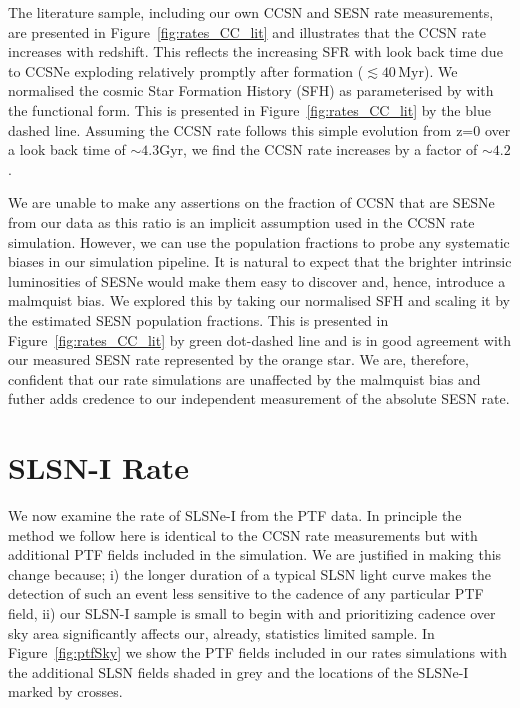 \documentclass[a4paper,fleqn,usenatbib]{mnras}
\begin{document}
The literature sample, including our own CCSN and SESN rate measurements, are presented in Figure~\ref{fig:rates_CC_lit} and illustrates that the CCSN rate increases with redshift. This reflects the increasing SFR with look back time due to CCSNe exploding relatively promptly after formation ($\lesssim40\,\mathrm{Myr}$). We normalised the cosmic Star Formation History (SFH) as parameterised by \citet{2008MNRAS.388.1487L} with the \citet{2001MNRAS.326..255C} functional form. This is presented in Figure~\ref{fig:rates_CC_lit} by the blue dashed line. Assuming the CCSN rate follows this simple evolution from z=0 over a look back time of $\sim4.3$Gyr, we find the CCSN rate increases by a factor of $\sim 4.2$.

We are unable to make any assertions on the fraction of CCSN that are SESNe from our data as this ratio is an implicit assumption used in the CCSN rate simulation. However, we can use the \citet{2017PASP..129e4201S} population fractions to probe any systematic biases in our simulation pipeline. It is natural to expect that the brighter intrinsic luminosities of SESNe would make them easy to discover and, hence, introduce a malmquist bias. We explored this by taking our normalised SFH and scaling it by the estimated SESN population fractions. This is presented in Figure~\ref{fig:rates_CC_lit} by green dot-dashed line and is in good agreement with our measured SESN rate represented by the orange star. We are, therefore, confident that our rate simulations are unaffected by the malmquist bias and futher adds credence to our independent measurement of the absolute SESN rate.


\section{SLSN-I Rate}

We now examine the rate of SLSNe-I from the PTF data. In principle the method we follow here is identical to the CCSN rate measurements but with additional PTF fields included in the simulation. We are justified in making this change because; i) the longer duration of a typical SLSN light curve makes the detection of such an event less sensitive to the cadence of any particular PTF field, ii) our SLSN-I sample is small to begin with and prioritizing cadence over sky area significantly affects our, already, statistics limited sample. In Figure~\ref{fig:ptfSky} we show the PTF fields included in our rates simulations with the additional SLSN fields shaded in grey and the locations of the SLSNe-I marked by crosses.
\end{document}
